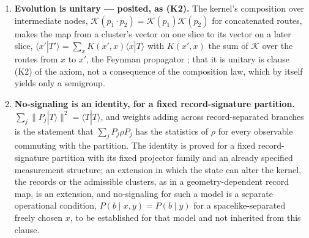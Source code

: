 \begin{theorem}
\begin{enumerate}
\item[(vii)] \textbf{Evolution is unitary --- posited, as (K2).} The kernel's composition over intermediate nodes, $\mathcal{K}(p_1 \cdot p_2) = \mathcal{K}(p_1)\mathcal{K}(p_2)$ for concatenated routes, makes the map from a cluster's vector on one slice to its vector on a later slice, $\langle x'|T'\rangle = \sum_x K(x',x)\langle x|T\rangle$ with $K(x',x)$ the sum of $\mathcal{K}$ over the routes from $x$ to $x'$, the Feynman propagator \cite{feynman1948}; that it is unitary is clause (K2) of the axiom, not a consequence of the composition law, which by itself yields only a semigroup.
\item[(viii)] \textbf{No-signaling is an identity, for a fixed record-signature partition.} $\sum_j \lVert P_j|T\rangle\rVert^2 = \langle T|T\rangle$, and weights adding across record-separated branches is the statement that $\sum_j P_j\rho P_j$ has the statistics of $\rho$ for every observable commuting with the partition.
The identity is proved for a fixed record-signature partition with its fixed projector family and an already specified measurement structure; an extension in which the state can alter the kernel, the records or the admissible clusters, as in a geometry-dependent record map, is an extension, and no-signaling for such a model is a separate operational condition, $P(b \mid x, y) = P(b \mid y)$ for a spacelike-separated freely chosen $x$, to be established for that model and not inherited from this clause. \end{enumerate}
\end{theorem}

